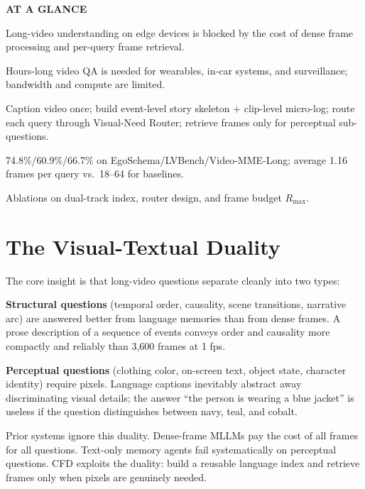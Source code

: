 \documentclass[10pt,twocolumn]{article}
\begin{document}
\begin{mdframed}[backgroundcolor=boxgray,linecolor=rulered,linewidth=1pt,
    innerleftmargin=6pt,innerrightmargin=6pt,
    innertopmargin=6pt,innerbottommargin=6pt]
\textbf{\small AT A GLANCE}\par\vspace{4pt}
\begin{description}[leftmargin=0pt,labelsep=4pt,itemsep=2pt,parsep=0pt,
    font=\small\bfseries]
  \item[Problem:] Long-video understanding on edge devices is blocked
    by the cost of dense frame processing and per-query frame retrieval.
  \item[Why it matters:] Hours-long video QA is needed for wearables,
    in-car systems, and surveillance; bandwidth and compute are limited.
  \item[Method:] Caption video once; build event-level story skeleton
    + clip-level micro-log; route each query through Visual-Need Router;
    retrieve frames only for perceptual sub-questions.
  \item[Result:] 74.8\%/60.9\%/66.7\% on EgoSchema/LVBench/Video-MME-Long;
    average 1.16 frames per query vs.\ 18--64 for baselines.
  \item[Evidence:] Ablations on dual-track index, router design,
    and frame budget $R_{\max}$.
\end{description}
\end{mdframed}

\section{The Visual-Textual Duality}

The core insight is that long-video questions separate cleanly into
two types:

\textbf{Structural questions} (temporal order, causality, scene
transitions, narrative arc) are answered better from language memories
than from dense frames. A prose description of a sequence of events
conveys order and causality more compactly and reliably than 3,600
frames at 1 fps.

\textbf{Perceptual questions} (clothing color, on-screen text, object
state, character identity) require pixels. Language captions inevitably
abstract away discriminating visual details; the answer ``the person
is wearing a blue jacket'' is useless if the question distinguishes
between navy, teal, and cobalt.

Prior systems ignore this duality. Dense-frame MLLMs pay the cost of
all frames for all questions. Text-only memory agents fail systematically
on perceptual questions. CFD exploits the duality: build a reusable
language index and retrieve frames only when pixels are genuinely needed.
\end{document}
